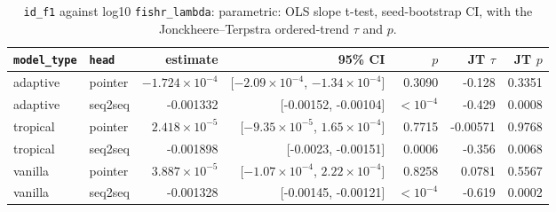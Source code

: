 \documentclass[10pt]{article}
\begin{document}
{\small
\begin{longtable}{llrrrrr}
\caption{\texttt{id\_f1} against log10 \texttt{fishr\_lambda}: parametric: OLS slope t-test, seed-bootstrap CI, with the Jonckheere--Terpstra ordered-trend $\tau$ and $p$.}\label{tab:trend-id_f1}\\
\toprule
\texttt{model\_type} & \texttt{head} & estimate & 95\% CI & $p$ & JT $\tau$ & JT $p$\\
\midrule
\endhead
adaptive & pointer & $-1.724\times10^{-4}$ & [$-2.09\times10^{-4}$, $-1.34\times10^{-4}$] & 0.3090 & -0.128 & 0.3351\\
adaptive & seq2seq & -0.001332 & [-0.00152, -0.00104] & $<10^{-4}$ & -0.429 & 0.0008\\
tropical & pointer & $2.418\times10^{-5}$ & [$-9.35\times10^{-5}$, $1.65\times10^{-4}$] & 0.7715 & -0.00571 & 0.9768\\
tropical & seq2seq & -0.001898 & [-0.0023, -0.00151] & 0.0006 & -0.356 & 0.0068\\
vanilla & pointer & $3.887\times10^{-5}$ & [$-1.07\times10^{-4}$, $2.22\times10^{-4}$] & 0.8258 & 0.0781 & 0.5567\\
vanilla & seq2seq & -0.001328 & [-0.00145, -0.00121] & $<10^{-4}$ & -0.619 & 0.0002\\
\bottomrule
\end{longtable}
}
\end{document}
